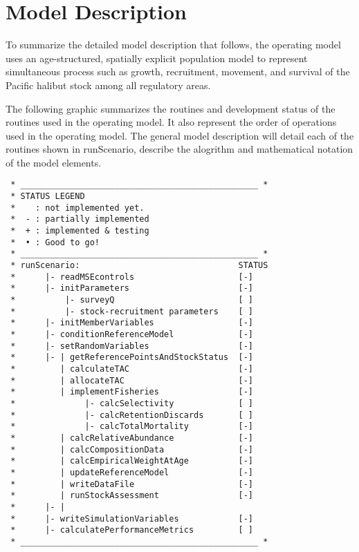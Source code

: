 \section{Model Description} %
\label{sec:model_description}
To summarize the detailed model description that follows, the operating model uses an age-structured, spatially explicit population model to represent simultaneous process such as growth, recruitment, movement, and survival of the Pacific halibut stock among all regulatory areas.

The following graphic summarizes the routines and development status of the routines used in the operating model.  It also represent the order of operations used in the operating model.  The general model description will detail each of the routines shown in runScenario, describe the alogrithm and mathematical notation of the model elements.
\begin{verbatim}
 * ________________________________________________ *
 * STATUS LEGEND
 *    : not implemented yet.
 *  - : partially implemented
 *  + : implemented & testing
 *  • : Good to go! 
 * ________________________________________________ *
 * runScenario:                                STATUS
 *      |- readMSEcontrols                     [-]
 *      |- initParameters                      [-]
 *          |- surveyQ                         [ ]
 *          |- stock-recruitment parameters    [ ]
 *      |- initMemberVariables                 [-]
 *      |- conditionReferenceModel             [-]
 *      |- setRandomVariables                  [-]
 *      |- | getReferencePointsAndStockStatus  [-]
 *         | calculateTAC                      [-]
 *         | allocateTAC                       [-]
 *         | implementFisheries                [-]
 *              |- calcSelectivity             [ ]
 *              |- calcRetentionDiscards       [ ]
 *              |- calcTotalMortality          [-]
 *         | calcRelativeAbundance             [-]
 *         | calcCompositionData               [-]
 *         | calcEmpiricalWeightAtAge          [-]
 *         | updateReferenceModel              [-]
 *         | writeDataFile                     [-]
 *         | runStockAssessment                [-]
 *      |- |            
 *      |- writeSimulationVariables            [-]
 *      |- calculatePerformanceMetrics         [ ]
 * ________________________________________________ *
\end{verbatim}

